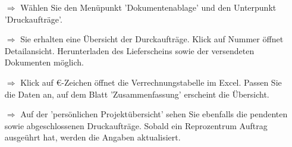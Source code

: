 \documentclass{article}
\begin{document}
\begin{multicols}{2}

\begin{tcolorbox}[colback=blue!5,colframe=blue!40!black,title=Druckaufträge Übersicht]
\begin{itemize}
  \item[$\Longrightarrow$] Wählen Sie den Menüpunkt 'Dokumentenablage' und den Unterpunkt 'Druckaufträge'.
  \item[$\Longrightarrow$] Sie erhalten eine Übersicht der Durckaufträge. Klick auf Nummer öffnet Detailansicht. Herunterladen des Lieferscheins sowie der versendeten Dokumenten möglich.
  \item[$\Longrightarrow$] Klick auf \euro{-Zeichen} öffnet die Verrechnungstabelle im Excel. Passen Sie die Daten an, auf dem Blatt 'Zusammenfassung' erscheint die Übersicht.
  \item[$\Longrightarrow$] Auf der 'persönlichen Projektübersicht' sehen Sie ebenfalls die pendenten sowie abgeschlossenen Druckaufträge. Sobald ein Reprozentrum Auftrag ausgeührt hat, werden die Angaben aktualisiert. 
\end{itemize}
\end{tcolorbox}


\begin{tcolorbox}[colback=blue!5,colframe=blue!40!black]

\begin{centering}
\end{centering}

\begin{centering}
\vspace{-15pt}
\end{centering}


\end{tcolorbox}


\end{multicols}
\end{document}
